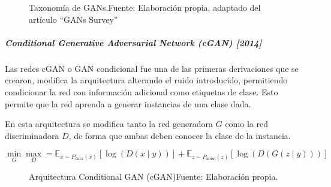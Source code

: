 \begin{figure}[H]
    \centering
    \centerline{}
    \caption{Taxonomía de GANs.\newline{}Fuente: Elaboración propia, adaptado del artículo ``GANs Survey'' \cite{GANSurvey_2021ZHENGWEIWANG}}
    \label{fig:gan-taxonomy}
\end{figure}


\subparagraph{Conditional Generative Adversarial Network (cGAN) [2014]}


Las redes \gls{cGAN} \cite{cGAN-mirza2014conditional,cGAN-zheng2021continuous,cGAN-li2022ttscgan,cGAN} o GAN condicional fue una de las primeras derivaciones que se crearon, modifica la arquitectura alterando el ruido introducido, permitiendo condicionar la red con información adicional como etiquetas de clase. Esto permite que la red aprenda a generar instancias de una clase dada.

En esta arquitectura se modifica tanto la red generadora ${G}$ como la red discriminadora ${D}$, de forma que ambas deben conocer la clase de la instancia.

\begin{equation}
    \min_{G}\max_{D}
    = \mathbb{E}_{x\sim{}P_{\text{data}}(x)}   \left[ \log{\left( D(x\mid{}y)     \right)} \right]
    + \mathbb{E}_{z\sim{}P_{\text{noise}}(z)}  \left[ \log{\left( D(G(z\mid{}y))  \right)} \right]
\end{equation}

\begin{figure}[H]
    \centering
    \centerline{}
    \caption{Arquitectura Conditional GAN (\gls{cGAN})\newline{}Fuente: Elaboración propia.}
    \label{fig:cGAN}
\end{figure}

